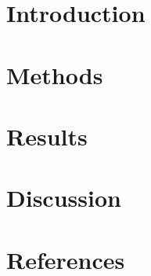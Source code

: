 \documentclass[
  11pt,
]{article}
\begin{document}
\hypertarget{introduction}{%
\section{Introduction}\label{introduction}}

\hypertarget{methods}{%
\section{Methods}\label{methods}}

\hypertarget{results}{%
\section{Results}\label{results}}

\hypertarget{discussion}{%
\section{Discussion}\label{discussion}}

\hypertarget{references}{%
\section{References}\label{references}}
\end{document}
